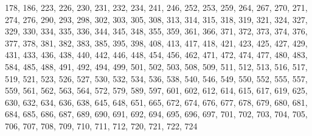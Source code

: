 178, 186, 223, 226, 230, 231, 232, 234, 241, 246, 252, 253, 259, 264, 267, 270, 271, 274, 276, 290, 293, 298, 302, 303, 305, 308, 313, 314, 315, 318, 319, 321, 324, 327, 329, 330, 334, 335, 336, 344, 345, 348, 355, 359, 361, 366, 371, 372, 373, 374, 376, 377, 378, 381, 382, 383, 385, 395, 398, 408, 413, 417, 418, 421, 423, 425, 427, 429, 431, 433, 436, 438, 440, 442, 446, 448, 454, 456, 462, 471, 472, 474, 477, 480, 483, 584, 485, 488, 491, 492, 494, 499, 501, 502, 503, 508, 509, 511, 512, 513, 516, 517, 519, 521, 523, 526, 527, 530, 532, 534, 536, 538, 540, 546, 549, 550, 552, 555, 557, 559, 561, 562, 563, 564, 572, 579, 589, 597, 601, 602, 612, 614, 615, 617, 619, 625, 630, 632, 634, 636, 638, 645, 648, 651, 665, 672, 674, 676, 677, 678, 679, 680, 681, 684, 685, 686, 687, 689, 690, 691, 692, 694, 695, 696, 697, 701, 702, 703, 704, 705, 706, 707, 708, 709, 710, 711, 712, 720, 721, 722, 724 
